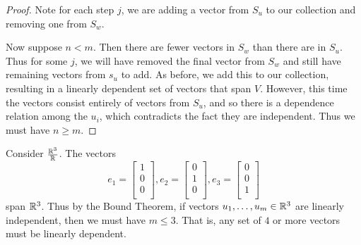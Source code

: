 \documentclass{article}
\begin{document}
\begin{proof}
    Note for each step $j$, we are adding a vector from $S_u$ to our collection and removing one from $S_w$.

    Now suppose $n < m$. Then there are fewer vectors in $S_w$ than there are in $S_u$. Thus for some $j$, we will have removed the final vector from $S_w$ and still have remaining vectors from $s_u$ to add. As before, we add this to our collection, resulting in a linearly dependent set of vectors that span $V$. However, this time the vectors consist entirely of vectors from $S_u$, and so there is a dependence relation among the $u_i$, which contradicts the fact they are independent. Thus we must have $n \geq m$.
  \end{proof}
  \begin{example}
    Consider $\frac{\mathbb{R}^3}{\mathbb{R}}$. The vectors
    \[
      e_1 =
      \begin{bmatrix}
        1\\0\\0\\
      \end{bmatrix}, e_2 =
      \begin{bmatrix}
        0\\1\\0\\
      \end{bmatrix}, e_3 =
      \begin{bmatrix}
        0\\0\\1\\
      \end{bmatrix}
    \]
    span $\mathbb{R}^3$. Thus by the Bound Theorem, if vectors $u_1, \ldots, u_m \in \mathbb{R}^3$ are linearly independent, then we must have $m \leq 3$. That is, any set of $4$ or more vectors must be linearly dependent.
  \end{example}
\end{document}
